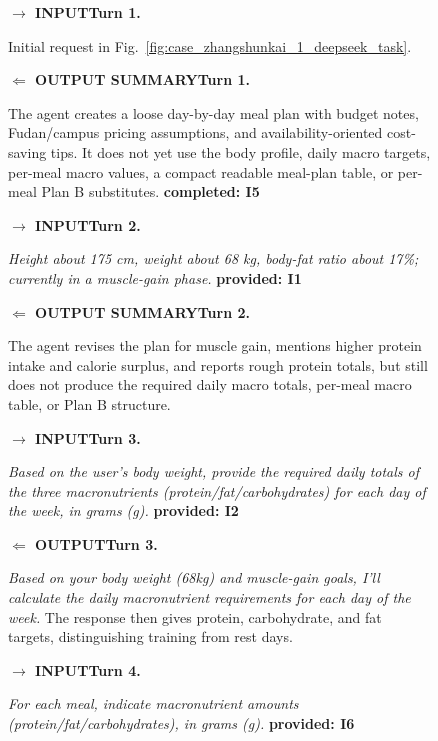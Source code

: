 \documentclass{llmxive}
\providecommand{\tcolorboxCase}[2]{\begin{tcolorbox}[
    title=#1,
    colback=casebg, 
    colframe=casetitlebg,
    rounded corners,
    sharp corners=northeast,
    sharp corners=southwest,
    width=1.00\linewidth,
    boxsep=2pt,
    top=2pt,
    bottom=2pt,
    enhanced,
    breakable,
    before=\setlength{\parindent}{0pt},
]

#2
\end{tcolorbox}
}
\providecommand{\caseZhangshunkaiOneTag}[3]{    {\setlength{\fboxsep}{1.6pt}\colorbox{#1}{\scriptsize\textbf{#3}}}}
\providecommand{\caseZhangshunkaiOneLine}[3]{    \caseZhangshunkaiOneTag{#1}{#2}{#3}\hspace{3pt}}
\providecommand{\caseZhangshunkaiOneIO}[3]{    \vspace{2pt}
    \noindent\caseZhangshunkaiOneLine{#1}{white}{#2}\textbf{#3}
}
\begin{document}
\begin{figure}[!htbp]
    \centering
    \tcolorboxCase{Case Study -- Researcher -- DeepSeek V3.2: Trajectory and Scores}{
    \small
    \caseZhangshunkaiOneIO{blue!65!black}{$\rightarrow$ INPUT}{Turn 1.}
    Initial request in Fig.~\ref{fig:case_zhangshunkai_1_deepseek_task}.

    \caseZhangshunkaiOneIO{green!45!black}{$\Leftarrow$ OUTPUT SUMMARY}{Turn 1.}
    The agent creates a loose day-by-day meal plan with budget notes, Fudan/campus pricing assumptions, and availability-oriented cost-saving tips.
    It does not yet use the body profile, daily macro targets, per-meal macro values, a compact readable meal-plan table, or per-meal Plan B substitutes.
    \caseZhangshunkaiOneTag{green!12}{green!45!black}{completed: I5}

    \vspace{3pt}
    \caseZhangshunkaiOneIO{blue!65!black}{$\rightarrow$ INPUT}{Turn 2.}
    \emph{Height about 175 cm, weight about 68 kg, body-fat ratio about 17\%; currently in a muscle-gain phase.}
    \caseZhangshunkaiOneTag{red!15}{red!70!black}{provided: I1}

    \caseZhangshunkaiOneIO{green!45!black}{$\Leftarrow$ OUTPUT SUMMARY}{Turn 2.}
    The agent revises the plan for muscle gain, mentions higher protein intake and calorie surplus, and reports rough protein totals, but still does not produce the required daily macro totals, per-meal macro table, or Plan B structure.

    \vspace{3pt}
    \caseZhangshunkaiOneIO{blue!65!black}{$\rightarrow$ INPUT}{Turn 3.}
    \emph{Based on the user's body weight, provide the required daily totals of the three macronutrients (protein/fat/carbohydrates) for each day of the week, in grams (g).}
    \caseZhangshunkaiOneTag{red!15}{red!70!black}{provided: I2}

    \caseZhangshunkaiOneIO{green!45!black}{$\Leftarrow$ OUTPUT}{Turn 3.}
    \emph{Based on your body weight (68kg) and muscle-gain goals, I'll calculate the daily macronutrient requirements for each day of the week.}
    The response then gives protein, carbohydrate, and fat targets, distinguishing training from rest days.

    \vspace{3pt}
    \caseZhangshunkaiOneIO{blue!65!black}{$\rightarrow$ INPUT}{Turn 4.}
    \emph{For each meal, indicate macronutrient amounts (protein/fat/carbohydrates), in grams (g).}
    \caseZhangshunkaiOneTag{red!15}{red!70!black}{provided: I6}

}
\end{figure}
\end{document}
